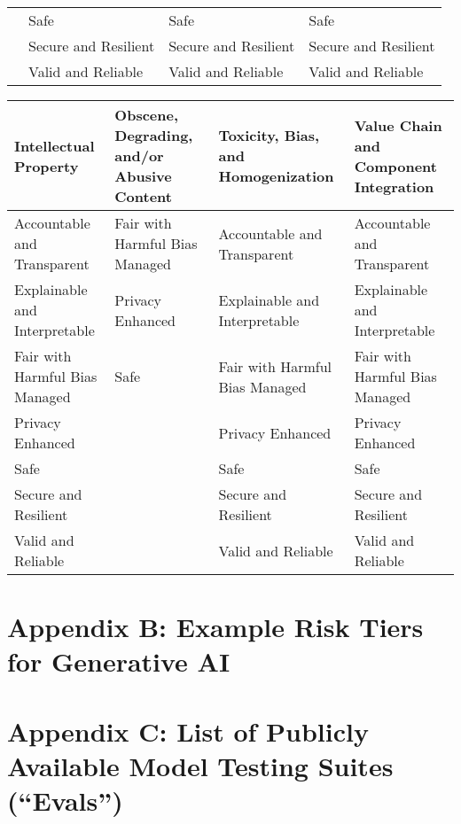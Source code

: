 \documentclass[fleqn]{article}
\begin{document}
\begin{landscape}
\begin{table}[H]
\begin{tabular}{llll}
		& Safe & Safe & Safe \\
		& Secure and Resilient & Secure and Resilient & Secure and Resilient \\
		& Valid and Reliable & Valid and Reliable & Valid and Reliable \\
		\bottomrule
	\end{tabular}
	\newline
	\vspace{10pt}
	\newline
	\begin{tabular}{llll}
		\toprule
		Intellectual Property & Obscene, Degrading, and/or Abusive Content & Toxicity, Bias, and Homogenization & Value Chain and Component Integration \\
		\midrule
		Accountable and Transparent & Fair with Harmful Bias Managed & Accountable and Transparent & Accountable and Transparent \\
		Explainable and Interpretable & Privacy Enhanced & Explainable and Interpretable & Explainable and Interpretable \\
		Fair with Harmful Bias Managed & Safe & Fair with Harmful Bias Managed & Fair with Harmful Bias Managed \\
		Privacy Enhanced &  & Privacy Enhanced & Privacy Enhanced \\
		Safe &  & Safe & Safe \\
		Secure and Resilient &  & Secure and Resilient & Secure and Resilient \\
		Valid and Reliable &  & Valid and Reliable & Valid and Reliable \\
		\bottomrule
	\end{tabular}
\end{table}
\vfill
\raisebox{-10pt}{\makebox[\linewidth]{\thepage}}
\end{landscape}

\section*{Appendix B: Example Risk Tiers for Generative AI}\label{sec:appndxb}

\section*{Appendix C: List of Publicly Available Model Testing Suites (``Evals'')}\label{sec:appndxc}
\end{document}
